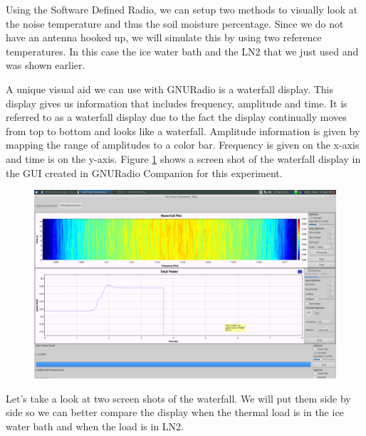 Using the Software Defined Radio, we can setup two methods to visually look at the noise temperature and thus the soil moisture percentage.  Since we do not have an antenna hooked up, we will simulate this by using two reference temperatures.  In this case the ice water bath and the LN2 that we just used and was shown earlier.  

A unique visual aid we can use with GNURadio is a waterfall display.  This display gives us information that includes frequency, amplitude and time.  It is referred to as a waterfall display due to the fact the display continually moves from top to bottom and looks like a waterfall.  Amplitude information is given by mapping the range of amplitudes to a color bar.  Frequency is given on the x-axis and time is on the y-axis.  Figure \ref{LN2_waterfall} shows a screen shot of the waterfall display in the GUI created in GNURadio Companion for this experiment.

\begin{figure}[h!tb] \centering

\includegraphics[width=\textwidth]{Experiments/Exp1/LN2_waterfall.png}

\label{LN2_waterfall}
\end{figure}

Let's take a look at two screen shots of the waterfall.  We will put them side by side so we can better compare the display when the thermal load is in the ice water bath and when the load is in LN2.

